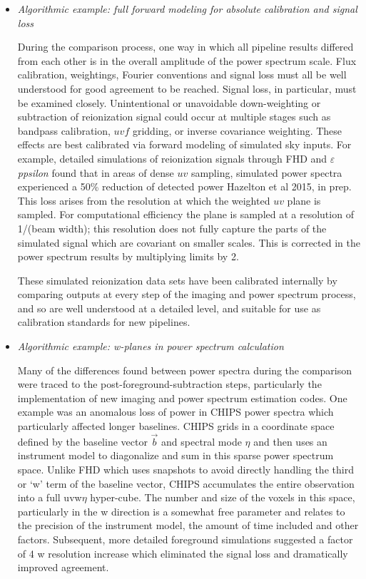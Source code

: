 \documentclass[twolcolumn,iop]{emulateapj}
\def\eppsilon{{\it $\varepsilon$ppsilon}}
\def\eppsiloncite{Hazelton et al 2015, in prep}
\begin{document}
\begin{itemize}
\item \emph{Algorithmic example: full forward modeling for absolute calibration and signal loss}

During the comparison process, one way in which all pipeline results differed from each other is in the overall amplitude of the power spectrum scale. Flux calibration, weightings, Fourier conventions and signal loss must all be well understood for good agreement to be reached.  Signal loss, in particular, must be examined closely. Unintentional or unavoidable down-weighting or subtraction of reionization signal could occur at multiple stages such as bandpass calibration, $uvf$ gridding, or inverse covariance weighting. These effects are best calibrated via forward modeling of simulated sky inputs.  For example, detailed simulations of reionization signals through FHD and \eppsilon{} found that in areas of dense $uv$ sampling, simulated power spectra experienced a 50\% reduction of detected power \eppsiloncite{}. This loss arises from the resolution at which the weighted $uv$ plane is sampled. For computational efficiency the plane is sampled at a resolution of 1/(beam width); this resolution does not fully capture the parts of the simulated signal which are covariant on smaller scales.    This is corrected in the power spectrum results by multiplying limits by 2.

These simulated reionization data sets have been calibrated internally by comparing outputs at every step of the imaging and power spectrum process, and so are well understood at a detailed level, and suitable for use as calibration standards for new pipelines.



\item \emph{Algorithmic example: w-planes in power spectrum calculation}


Many of the differences found between power spectra during the comparison were traced to the post-foreground-subtraction steps, particularly the implementation of new imaging and power spectrum estimation codes.  One example was an anomalous loss of power in CHIPS power spectra which particularly affected longer baselines.  CHIPS grids in a coordinate space defined by the baseline vector $\vec{b}$ and spectral mode $\eta$ and then uses an instrument model to diagonalize and sum in this sparse power spectrum space.  Unlike FHD which uses snapshots to avoid directly handling the third or `w' term of the baseline vector, CHIPS accumulates the entire observation into a full uvw$\eta$ hyper-cube.  The number and size of the voxels in this space, particularly in the w direction is a somewhat free parameter and relates to the precision of the instrument model, the amount of time included and other factors.  Subsequent, more detailed foreground simulations suggested a factor of 4 w resolution increase which eliminated the signal loss and dramatically improved agreement.



\end{itemize}
\end{document}
